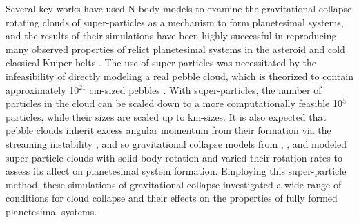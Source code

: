 \documentclass[fleqn,usenatbib]{mnras}
\begin{document}
Several key works have used N-body models to examine the gravitational collapse rotating clouds of super-particles as a mechanism to form planetesimal systems, and the results of their simulations have been highly successful in reproducing many observed properties of relict planetesimal systems in the asteroid and cold classical Kuiper belts \citep{Nesvorny2010,Robinson2020,Nesvorny2021,Barnes2025}.
The use of super-particles was necessitated by the infeasibility of directly modeling a real pebble cloud, which is theorized to contain approximately 10$^{21}$ cm-sized pebbles \citep{Johansen2014}.
With super-particles, the number of particles in the cloud can be scaled down to a more computationally feasible 10$^{5}$ particles, while their sizes are scaled up to km-sizes.
It is also expected that pebble clouds inherit excess angular momentum from their formation via the streaming instability \citep{Johansen2007b,Nesvorny2019}, and so gravitational collapse models from \citet{Nesvorny2010,Nesvorny2021}, \citet{Robinson2020}, and \citet{Barnes2025} modeled super-particle clouds with solid body rotation and varied their rotation rates to assess its affect on planetesimal system formation.
Employing this super-particle method, these simulations of gravitational collapse investigated a wide range of conditions for cloud collapse and their effects on the properties of fully formed planetesimal systems.
\end{document}
